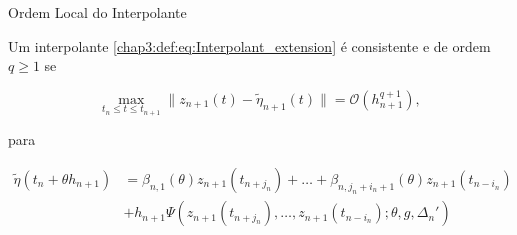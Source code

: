 \documentclass{beamer}
\theoremstyle{plain}
\theoremstyle{definition}
\begin{document}
\begin{frame}{Ordem Local do Interpolante}


    \small
    \begin{definition}
        \label{chap3:def:interpolant_extension_order}

        Um interpolante \eqref{chap3:def:eq:Interpolant_extension} é consistente e de ordem $q \geq 1$ se


        \begin{equation}
            \max_{t_n \leq t \leq t_{n+1}}\| z_{n+1}(t) - \tilde{ \eta }_{n+1}(t) \| = \mathcal{O} (h_{n+1}^{q+1}), 
            \label{chap3:eq:Interpolant_extension_order}
        \end{equation}

        para 

        \begin{equation}
            \begin{split}
                \tilde{\eta}(t_{n} + \theta h_{n+1}) &= \beta_{n, 1}(\theta) z_{n+1}(t_{n+j_n}) + \dots + \beta_{n, j_n + i_n + 1}(\theta) z_{n+1}(t_{n-i_n}) \\
                                                     &+ h_{n+1} \Psi(z_{n+1}(t_{n+ j_n}), \dots, z_{n+1}(t_{n-i_n}); \theta,  g, \Delta_n ')
            \end{split}
            \label{chap3:def:interpolant_extension_order:eq:1}
        \end{equation}

    \end{definition}

\end{frame}



\end{document}
